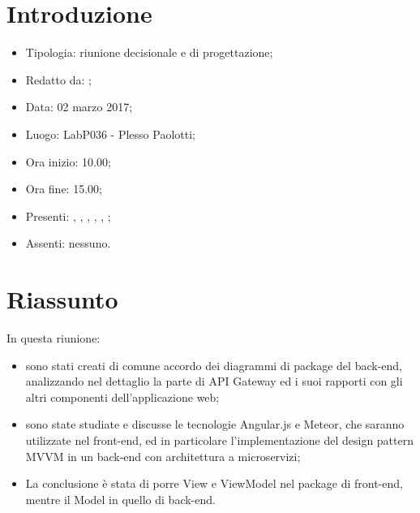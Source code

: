 \section{Introduzione}

	\begin{itemize}
		\item Tipologia: riunione decisionale e di progettazione;
		\item Redatto da: \MC;
		\item Data: 02 marzo 2017;
		\item Luogo: LabP036 - Plesso Paolotti;
		\item Ora inizio: 10.00;
		\item Ora fine: 15.00;
		\item Presenti: \AN, \AS, \DAN, \DS, \MC, \NS;	
		\item Assenti: nessuno.
	\end{itemize}

\section{Riassunto}
In questa riunione:

\begin{itemize}
	\item sono stati creati di comune accordo dei diagrammi di package del back-end, analizzando nel dettaglio la parte di API Gateway ed i suoi rapporti con gli altri componenti dell'applicazione web;
	\item  sono state studiate e discusse le tecnologie Angular.js e Meteor, che saranno utilizzate nel front-end, ed in particolare l'implementazione del design pattern MVVM in un back-end con architettura a microservizi;
	\item La conclusione è stata di porre View e ViewModel nel package di front-end, mentre il Model in quello di back-end.
\end{itemize}
